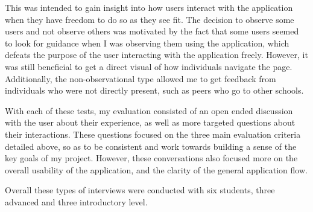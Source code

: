 \documentclass[10pt,twocolumn]{article}
\begin{document}
This was intended to gain insight into how users interact with the application when they have freedom to do 
so as they see fit. The decision to observe some users and not observe others was motivated by the fact that some users 
seemed to look for guidance when I was observing them using the application, which defeats the purpose of the user interacting 
with the application freely. However, it was still beneficial to get a direct visual of how individuals navigate the page.
Additionally, the non-observational type allowed me to get feedback from individuals who were not directly present, such as 
peers who go to other schools.

With each of these tests, my evaluation consisted of an open ended discussion with the user about their experience, as 
well as more targeted questions about their interactions. These questions focused on the three main evaluation criteria 
detailed above, so as to be consistent and work towards building a sense of the key goals of my project. However, these 
conversations also focused more on the overall usability of the application, and the clarity of the general application 
flow.

Overall these types of interviews were conducted with six students, three advanced and three introductory level.  



\end{document}
